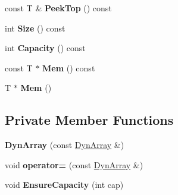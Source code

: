 \begin{DoxyCompactItemize}
\item 
const T \& {\bfseries Peek\+Top} () const \hypertarget{classtinyxml2_1_1_dyn_array_a9c2282ea8901b5a92ccaac2e6166a788}{}\label{classtinyxml2_1_1_dyn_array_a9c2282ea8901b5a92ccaac2e6166a788}

\item 
int {\bfseries Size} () const \hypertarget{classtinyxml2_1_1_dyn_array_a1299b257b62ea6b4983c488867f219b0}{}\label{classtinyxml2_1_1_dyn_array_a1299b257b62ea6b4983c488867f219b0}

\item 
int {\bfseries Capacity} () const \hypertarget{classtinyxml2_1_1_dyn_array_a8edbe90ed53b2e46b1b5cf53b261e4e7}{}\label{classtinyxml2_1_1_dyn_array_a8edbe90ed53b2e46b1b5cf53b261e4e7}

\item 
const T $\ast$ {\bfseries Mem} () const \hypertarget{classtinyxml2_1_1_dyn_array_a1f39330daeb97d3d1dc3fc12dcf7ac67}{}\label{classtinyxml2_1_1_dyn_array_a1f39330daeb97d3d1dc3fc12dcf7ac67}

\item 
T $\ast$ {\bfseries Mem} ()\hypertarget{classtinyxml2_1_1_dyn_array_a0e0d60b399d54fad5b33d5008bc59c8e}{}\label{classtinyxml2_1_1_dyn_array_a0e0d60b399d54fad5b33d5008bc59c8e}

\end{DoxyCompactItemize}
\subsection*{Private Member Functions}
\begin{DoxyCompactItemize}
\item 
{\bfseries Dyn\+Array} (const \hyperlink{classtinyxml2_1_1_dyn_array}{Dyn\+Array} \&)\hypertarget{classtinyxml2_1_1_dyn_array_af021ee76658c8a31ea7b4a2ab1bf666d}{}\label{classtinyxml2_1_1_dyn_array_af021ee76658c8a31ea7b4a2ab1bf666d}

\item 
void {\bfseries operator=} (const \hyperlink{classtinyxml2_1_1_dyn_array}{Dyn\+Array} \&)\hypertarget{classtinyxml2_1_1_dyn_array_ad4b8501b663981654a0fd2c0c1d08c33}{}\label{classtinyxml2_1_1_dyn_array_ad4b8501b663981654a0fd2c0c1d08c33}

\item 
void {\bfseries Ensure\+Capacity} (int cap)\hypertarget{classtinyxml2_1_1_dyn_array_a60c1143094f43766c456bee9e329cae2}{}\label{classtinyxml2_1_1_dyn_array_a60c1143094f43766c456bee9e329cae2}

\end{DoxyCompactItemize}
